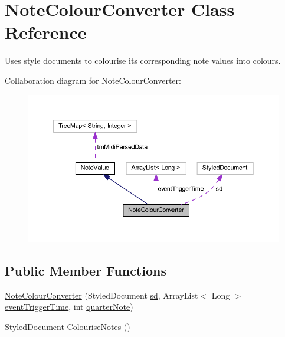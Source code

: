 \hypertarget{classcom_1_1lclion_1_1midiparser_1_1_note_colour_converter}{\section{Note\+Colour\+Converter Class Reference}
\label{classcom_1_1lclion_1_1midiparser_1_1_note_colour_converter}
}


Uses style documents to colourise its corresponding note values into colours.  




Collaboration diagram for Note\+Colour\+Converter\+:\nopagebreak
\begin{figure}[H]
\begin{center}
\leavevmode
\includegraphics[width=350pt]{classcom_1_1lclion_1_1midiparser_1_1_note_colour_converter__coll__graph}
\end{center}
\end{figure}
\subsection*{Public Member Functions}
\begin{DoxyCompactItemize}
\item 
\hyperlink{classcom_1_1lclion_1_1midiparser_1_1_note_colour_converter_a63a6286bf21baa00408e9c77f8959374}{Note\+Colour\+Converter} (Styled\+Document \hyperlink{classcom_1_1lclion_1_1midiparser_1_1_note_colour_converter_ac31cda90c1001f063265ba84725dd62e}{sd}, Array\+List$<$ Long $>$ \hyperlink{classcom_1_1lclion_1_1midiparser_1_1_note_colour_converter_a74fa4197a892bf1767a6e5eb295e00ab}{event\+Trigger\+Time}, int \hyperlink{classcom_1_1lclion_1_1midiparser_1_1_note_colour_converter_a52304efcbc33b0b7cb2b3db90a30cc6d}{quarter\+Note})
\item 
Styled\+Document \hyperlink{classcom_1_1lclion_1_1midiparser_1_1_note_colour_converter_a1182e71888040b74469d2a6329c0e363}{Colourise\+Notes} ()
\end{DoxyCompactItemize}
